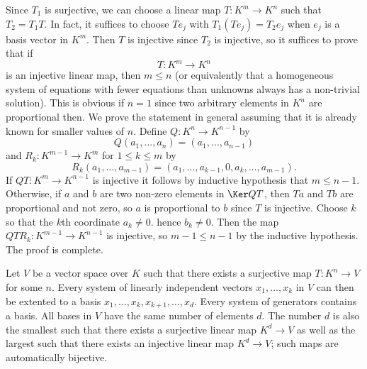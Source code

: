 \begin{prf}
  Since $T_1$ is surjective, we can choose a linear map $T: K^m\to K^n$
  such that $T_2=T_1T$. In fact, it suffices to choose $Te_j$ with
  $T_1(Te_j)=T_2e_j$ when $e_j$ is a basis vector in $K^m$. Then $T$ is
  injective since $T_2$ is injective, so it suffices to prove that if
  \begin{displaymath}
    T: K^m\to K^n
  \end{displaymath}
is an injective linear map, then $m\leq n$ (or equivalently that
a homogeneous system of equations with fewer equations than unknowns
always has a non-trivial solution). This is obvious if $n=1$ since two
arbitrary elements in $K^n$ are proportional then. We prove the
statement in general assuming that it is already known for smaller
values of $n$. Define $Q: K^n\to K^{n-1}$ by
\begin{displaymath}
  Q(a_1,\dots,a_n)=(a_1,\dots,a_{n-1})
\end{displaymath}
and $R_k: K^{m-1}\to K^m$ for $1\leq k\leq m$ by
\begin{displaymath}
  R_k(a_1,\dots,a_{m-1})=(a_1,\dots,a_{k-1},0,a_k,\dots,a_{m-1}).
\end{displaymath}
If $QT: K^m\to K^{n-1}$ is injective it follows by inductive
hypothesis that $m\leq n-1$. Otherwise, if $a$ and $b$ are two
non-zero elements in $\Ker QT$, then $Ta$ and $Tb$ are proportional
and not zero, so $a$ is proportional to $b$ since $T$ is
injective. Choose $k$ so that the $k$th coordinate $a_k\neq 0$. hence
$b_k\neq 0$. Then the map $QTR_k: K^{m-1}\to K^{n-1}$ is injective,
so $m-1\leq n-1$ by the inductive hypothesis. The proof is complete.
\end{prf}
\begin{thm}
  Let $V$ be a vector space over $K$ such that there exists a
  surjective map $T: K^n\to V$ for some $n$. Every system of linearly
  independent vectors $x_1,\dots,x_k$ in $V$ can then be extented to a
  basis $x_1,\dots,x_k,x_{k+1},\dots,x_d$. Every system of generators
  contains a basis. All bases in $V$ have the same number of elements
  $d$. The number $d$ is also the smallest such that there exists a
  surjective linear map $K^{d}\to V$ as well as the largest such that
  there exists an injective linear map $K^d\to V$; such maps are
  automatically bijective.
\end{thm}
